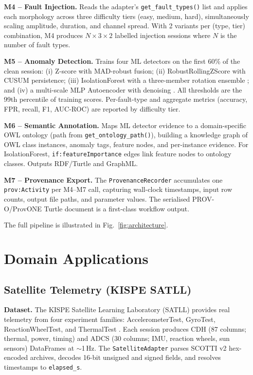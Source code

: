 \documentclass[conference]{IEEEtran}
\begin{document}
\textbf{M4 -- Fault Injection.} Reads the adapter's \texttt{get\_fault\_types()}
list and applies each morphology across three difficulty tiers (easy, medium, hard),
simultaneously scaling amplitude, duration, and channel spread. With 2 variants per
(type, tier) combination, M4 produces $N \times 3 \times 2$ labelled injection
sessions where $N$ is the number of fault types.

\textbf{M5 -- Anomaly Detection.} Trains four ML detectors on the first 60\% of
the clean session: (i) Z-score with MAD-robust fusion; (ii) RobustRollingZScore
with CUSUM persistence; (iii) IsolationForest with a three-member rotation ensemble
\cite{liu2008isolation}; and (iv) a multi-scale MLP Autoencoder with denoising
\cite{malhotra2016lstm}. All thresholds are the 99th percentile of training scores.
Per-fault-type and aggregate metrics (accuracy, FPR, recall, F1, AUC-ROC) are
reported by difficulty tier.

\textbf{M6 -- Semantic Annotation.} Maps ML detector evidence to a domain-specific
OWL ontology (path from \texttt{get\_ontology\_path()}), building a knowledge graph
of OWL class instances, anomaly tags, feature nodes, and per-instance evidence. For
IsolationForest, \texttt{if:featureImportance} edges link feature nodes to ontology
classes. Outputs RDF/Turtle and GraphML.

\textbf{M7 -- Provenance Export.} The \texttt{ProvenanceRecorder} accumulates one
\texttt{prov:Activity} per M4--M7 call, capturing wall-clock timestamps, input row
counts, output file paths, and parameter values. The serialised PROV-O/ProvONE
Turtle document is a first-class workflow output.

The full pipeline is illustrated in Fig.~\ref{fig:architecture}.

\section{Domain Applications}
\label{sec:domains}

\subsection{Satellite Telemetry (KISPE SATLL)}

\textbf{Dataset.} The KISPE Satellite Learning Laboratory (SATLL) provides
real telemetry from four experiment families: AccelerometerTest, GyroTest,
ReactionWheelTest, and ThermalTest \cite{kispe_satll}. Each session produces
CDH (87 columns; thermal, power, timing) and ADCS (30 columns; IMU, reaction
wheels, sun sensors) DataFrames at $\sim$1\,Hz. The \texttt{SatelliteAdapter}
parses SCOTTI v2 hex-encoded archives, decodes 16-bit unsigned and signed fields,
and resolves timestamps to \texttt{elapsed\_s}.
\end{document}
